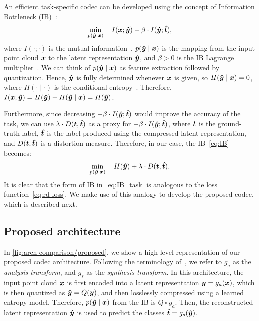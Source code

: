 An efficient task-specific codec can be developed using the concept of Information Bottleneck (IB)~\cite{IB_Allerton1999}:
\begin{equation}
  \min_{p({\boldsymbol{\hat{y}}} \mid {\boldsymbol{x}})} \quad I({\boldsymbol{x}}; {\boldsymbol{\hat{y}}}) - \beta \cdot I({\boldsymbol{\hat{y}}} ; {\boldsymbol{\hat{t}}}),
\label{eq:IB}
\end{equation}
where $I(\cdot;\cdot)$ is the mutual information~\cite{Cover_Thomas_2006}, $p({\boldsymbol{\hat{y}}} \mid {\boldsymbol{x}})$ is the mapping from the input point cloud ${\boldsymbol{x}}$ to the latent representation ${\boldsymbol{\hat{y}}}$, and $\beta>0$ is the IB Lagrange multiplier~\cite{IB_Allerton1999}.
We can think of $p({\boldsymbol{\hat{y}}} \mid {\boldsymbol{x}})$ as feature extraction followed by quantization.
Hence, ${\boldsymbol{\hat{y}}}$ is fully determined whenever ${\boldsymbol{x}}$ is given, so $H({\boldsymbol{\hat{y}}} \mid {\boldsymbol{x}}) = 0$, where $H(\cdot \mid \cdot)$ is the conditional entropy~\cite{Cover_Thomas_2006}.
Therefore, $I({\boldsymbol{x}}; {\boldsymbol{\hat{y}}}) = H({\boldsymbol{\hat{y}}}) - H({\boldsymbol{\hat{y}}} \mid {\boldsymbol{x}}) = H({\boldsymbol{\hat{y}}})$.

Furthermore, since decreasing $-\beta\cdot I({\boldsymbol{\hat{y}}} ; {\boldsymbol{\hat{t}}})$ would improve the accuracy of the task, we can use $\lambda \cdot D({\boldsymbol{t}},{\boldsymbol{\hat{t}}})$ as a proxy for $-\beta\cdot I({\boldsymbol{\hat{y}}} ; {\boldsymbol{\hat{t}}})$, where ${\boldsymbol{t}}$ is the ground-truth label, ${\boldsymbol{\hat{t}}}$ is the label produced using the compressed latent representation, and $D({\boldsymbol{t}},{\boldsymbol{\hat{t}}})$ is a distortion measure.
Therefore, in our case, the IB~\eqref{eq:IB} becomes:
\begin{equation}
  \min_{p({\boldsymbol{\hat{y}}} \mid {\boldsymbol{x}})} \quad H({\boldsymbol{\hat{y}}}) + \lambda \cdot D({\boldsymbol{t}},{\boldsymbol{\hat{t}}}).
\label{eq:IB_task}
\end{equation}
It is clear that the form of IB in~\eqref{eq:IB_task} is analogous to the loss function~\eqref{eq:rd-loss}.
We make use of this analogy to develop the proposed codec, which is described next.



\subsection{Proposed architecture}

In \cref{fig:arch-comparison/proposed}, we show a high-level representation of our proposed codec architecture.
Following the terminology of~\cite{balle2018variational}, we refer to $g_a$ as the \emph{analysis transform}, and $g_s$ as the \emph{synthesis transform}.
In this architecture, the input point cloud ${\boldsymbol{x}}$ is first encoded into a latent representation ${\boldsymbol{y}} = g_a({\boldsymbol{x}})$, which is then quantized as ${\boldsymbol{\hat{y}}} = Q({\boldsymbol{y}})$, and then losslessly compressed using a learned entropy model.
Therefore, $p({\boldsymbol{\hat{y}}} \mid {\boldsymbol{x}})$ from the IB is $Q \circ g_a$.
Then, the reconstructed latent representation ${\boldsymbol{\hat{y}}}$ is used to predict the classes ${\boldsymbol{\hat{t}}} = g_s({\boldsymbol{\hat{y}}})$.

